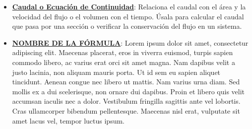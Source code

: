 
\begin{itemize}
	\item \hyperlink{caudal_cont}{\textbf{Caudal o Ecuación de Continuidad}}: Relaciona el caudal con el área y la velocidad del flujo o el volumen con el tiempo. Úsala para calcular el caudal que pasa por una sección o verificar la conservación del flujo en un sistema.
	
	\item \hyperlink{ENLACE CON ARCHIVO 'Tema n.tex'}{\textbf{NOMBRE DE LA FÓRMULA}}: Lorem ipsum dolor sit amet, consectetur adipiscing elit. Maecenas placerat, eros in viverra euismod, turpis sapien commodo libero, ac varius erat orci sit amet magna. Nam dapibus velit a justo lacinia, non aliquam mauris porta. Ut id sem eu sapien aliquet tincidunt. Aenean congue nec libero ut mattis. Nam varius urna diam. Sed mollis ex a dui scelerisque, non ornare dui dapibus. Proin et libero quis velit accumsan iaculis nec a dolor. Vestibulum fringilla sagittis ante vel lobortis. Cras ullamcorper bibendum pellentesque. Maecenas nisl erat, vulputate sit amet lacus vel, tempor luctus ipsum.
	
\end{itemize}